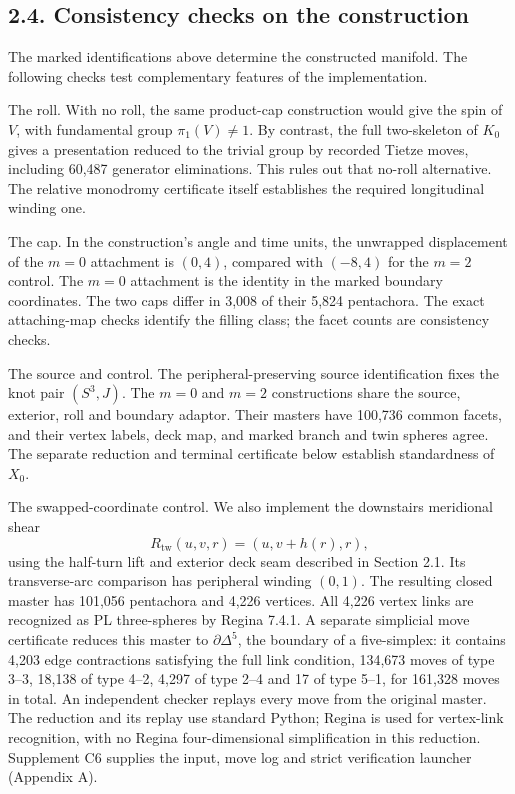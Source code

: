\documentclass[11pt,letterpaper]{article}
\begin{document}
\subsection*{2.4. Consistency checks on the construction}
The marked identifications above determine the constructed manifold. The following checks test complementary features of the implementation.

The roll. With no roll, the same product-cap construction would give the spin of $V$, with fundamental group $\pi_1(V)\neq1$. By contrast, the full two-skeleton of $K_0$ gives a presentation reduced to the trivial group by recorded Tietze moves, including 60,487 generator eliminations. This rules out that no-roll alternative. The relative monodromy certificate itself establishes the required longitudinal winding one.

The cap. In the construction's angle and time units, the unwrapped displacement of the $m=0$ attachment is $(0,4)$, compared with $(-8,4)$ for the $m=2$ control. The $m=0$ attachment is the identity in the marked boundary coordinates. The two caps differ in 3,008 of their 5,824 pentachora. The exact attaching-map checks identify the filling class; the facet counts are consistency checks.

The source and control. The peripheral-preserving source identification fixes the knot pair $(S^3,J)$. The $m=0$ and $m=2$ constructions share the source, exterior, roll and boundary adaptor. Their masters have 100,736 common facets, and their vertex labels, deck map, and marked branch and twin spheres agree. The separate reduction and terminal certificate below establish standardness of $X_0$.

The swapped-coordinate control. We also implement the downstairs meridional shear
\[
R_{\mathrm{tw}}(u,v,r)=(u,v+h(r),r),
\]
using the half-turn lift and exterior deck seam described in Section 2.1. Its transverse-arc comparison has peripheral winding $(0,1)$. The resulting closed master has 101,056 pentachora and 4,226 vertices. All 4,226 vertex links are recognized as PL three-spheres by Regina 7.4.1. A separate simplicial move certificate reduces this master to $\partial\Delta^5$, the boundary of a five-simplex: it contains 4,203 edge contractions satisfying the full link condition, 134,673 moves of type 3--3, 18,138 of type 4--2, 4,297 of type 2--4 and 17 of type 5--1, for 161,328 moves in total. An independent checker replays every move from the original master. The reduction and its replay use standard Python; Regina is used for vertex-link recognition, with no Regina four-dimensional simplification in this reduction. Supplement C6 supplies the input, move log and strict verification launcher (Appendix A).
\end{document}
